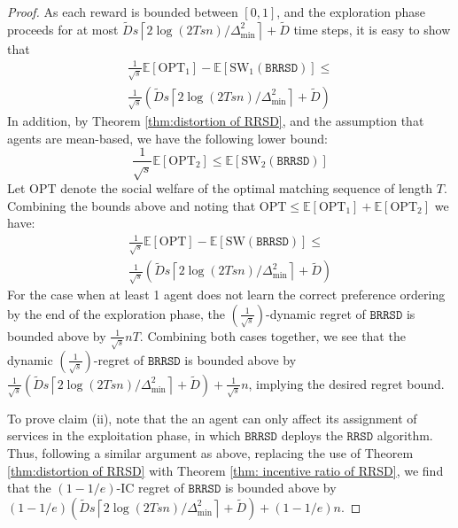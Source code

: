 \documentclass[letterpaper,11pt]{article}
\begin{document}
\begin{proof}
As each reward is bounded between $[0, 1]$, and the exploration phase proceeds for at most $\tilde{D}s\left\lceil2\log(2Tsn)/\Delta_{\text{min}}^{2}\right\rceil + \tilde{D}$ time steps, it is easy to show that
\begin{align*}
    \frac{1}{\sqrt{s}}\mathbb{E}\left[\textrm{OPT}_{1}\right] - \mathbb{E}\left[\textrm{SW}_{1}(\texttt{BRRSD})\right]  \leq \\ \frac{1}{\sqrt{s}}\left(\tilde{D}s\left\lceil2\log(2Tsn)/\Delta_{\text{min}}^{2}\right\rceil + \tilde{D}\right)
\end{align*}
In addition, by Theorem \ref{thm:distortion of RRSD}, and the assumption that agents are mean-based, we have the following lower bound:
\begin{equation*}
    \frac{1}{\sqrt{s}}\mathbb{E}\left[\textrm{OPT}_{2}\right] \leq \mathbb{E}\left[\textrm{SW}_{2}(\texttt{BRRSD})\right]
\end{equation*}
Let $\textrm{OPT}$ denote the social welfare of the optimal matching sequence of length $T$. Combining the bounds above and noting that $\textrm{OPT} \leq \mathbb{E}[\textrm{OPT}_{1}] + \mathbb{E}[\textrm{OPT}_{2}]$ we have:
\begin{align*}
    \frac{1}{\sqrt{s}}\mathbb{E}[\textrm{OPT}]- \mathbb{E}[\textrm{SW}(\texttt{BRRSD})] \leq \\
    \frac{1}{\sqrt{s}}\left(\tilde{D}s\left\lceil2\log(2Tsn)/\Delta_{\text{min}}^{2}\right\rceil + \tilde{D}\right)
\end{align*}
For the case when at least 1 agent does not learn the correct preference ordering by the end of the exploration phase, the $(\frac{1}{\sqrt{s}})$-dynamic regret of $\texttt{BRRSD}$ is bounded above by $\frac{1}{\sqrt{s}}nT$. Combining both cases together, we see that the dynamic $(\frac{1}{\sqrt{s}})$-regret of $\texttt{BRRSD}$ is bounded above by $\frac{1}{\sqrt{s}}\left(\tilde{D}s\left\lceil2\log(2Tsn)/\Delta_{\text{min}}^{2}\right\rceil + \tilde{D}\right) + \frac{1}{\sqrt{s}}n$, implying the desired regret bound. 

To prove claim (ii), note that the an agent can only affect its assignment of services in the exploitation phase, in which $\texttt{BRRSD}$ deploys the $\texttt{RRSD}$ algorithm. Thus, following a similar argument as above, replacing the use of Theorem \ref{thm:distortion of RRSD} with Theorem \ref{thm: incentive ratio of RRSD}, we find that the $(1- 1/e)$-IC regret of $\texttt{BRRSD}$ is  bounded above by $(1 - 1/e)\left(\tilde{D}s\left\lceil2\log(2Tsn)/\Delta_{\text{min}}^{2}\right\rceil + \tilde{D}\right) + (1-1/e)n$.


\end{proof}
\end{document}
